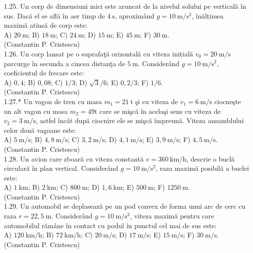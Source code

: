 1.25. Un corp de dimensiuni mici este aruncat de la nivelul solului pe verticală în sus. Dacă el se află în aer timp de $4 \mathrm{~s}$, aproximând $g=10 \mathrm{~m} / \mathrm{s}^{2}$, înălțimea maximă atinsă de corp este:\\ A) $20 \mathrm{~m}$; B) $18 \mathrm{~m}$; C) $24 \mathrm{~m}$; D) $15 \mathrm{~m}$; E) $45 \mathrm{~m}$; F) $30 \mathrm{~m}$.\\ (Constantin P. Cristescu)\\

1.26. Un corp lansat pe o suprafaţă orizontală cu viteza inițială $v_{0}=20 \mathrm{~m} / \mathrm{s}$ parcurge în secunda a cincea distanţa de $5 \mathrm{~m}$. Considerând $g=10 \mathrm{~m} / \mathrm{s}^{2}$, coeficientul de frecare este:\\ A) $0,4$; B) $0,08$; C) $1 / 3$; D) $\sqrt{3} / 6$; E) $0,2 / 3$; F) $1 / 6$.\\ (Constantin P. Cristescu)\\

1.27.* Un vagon de tren cu masa $m_{1}=21 \mathrm{~t}$ şi cu viteza de $v_{1}=6 \mathrm{~m} / \mathrm{s}$ ciocneşte un alt vagon cu masa $m_{2}=49 \mathrm{t}$ care se mişcă în acelaşi sens cu viteza de $v_{2}=3 \mathrm{~m} / \mathrm{s}$, astfel încât după ciocnire ele se mişcă împreună. Viteza ansamblului celor două vagoane este:\\ A) $5 \mathrm{~m} / \mathrm{s}$; B) $4,8 \mathrm{~m} / \mathrm{s}$; C) $3,2 \mathrm{~m} / \mathrm{s}$; D) $4,1 \mathrm{~m} / \mathrm{s}$; E) $3,9 \mathrm{~m} / \mathrm{s}$; F) $4,5 \mathrm{~m} / \mathrm{s}$.\\ (Constantin P. Cristescu)\\

1.28. Un avion care zboară cu viteza constantă $v=360 \mathrm{~km} / \mathrm{h}$, descrie o buclă circulară în plan vertical. Considerând $g=10 \mathrm{~m} / \mathrm{s}^{2}$, raza maximă posibilă a buclei este:\\ A) $1 \mathrm{~km}$; B) $2 \mathrm{~km}$; C) $800 \mathrm{~m}$; D) $1,6 \mathrm{~km}$; E) $500 \mathrm{~m}$; F) $1250 \mathrm{~m}$.\\ (Constantin P. Cristescu)\\

1.29. Un automobil se deplasează pe un pod convex de forma unui arc de cerc cu raza $r=22,5 \mathrm{~m}$. Considerând $g=10 \mathrm{~m} / \mathrm{s}^{2}$, viteza maximă pentru care automobilul rămâne în contact cu podul în punctul cel mai de sus este:\\ A) $120 \mathrm{~km} / \mathrm{h}$; B) $72 \mathrm{~km} / \mathrm{h}$; C) $20 \mathrm{~m} / \mathrm{s}$; D) $17 \mathrm{~m} / \mathrm{s}$; E) $15 \mathrm{~m} / \mathrm{s}$; F) $30 \mathrm{~m} / \mathrm{s}$.\\ (Constantin P. Cristescu)\\

